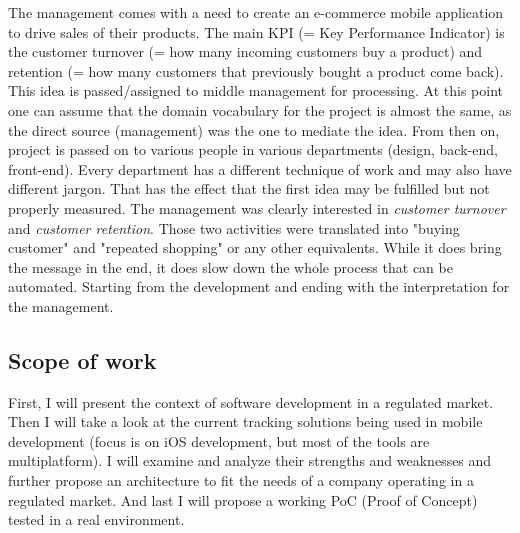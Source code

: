 The management comes with a need to create an e-commerce mobile application to drive sales of their products. The main KPI (= Key Performance Indicator) is the customer turnover (= how many incoming customers buy a product) and retention (= how many customers that previously bought a product come back). This idea is passed/assigned to middle management for processing. At this point one can assume that the domain vocabulary for the project is almost the same, as the direct source (management) was the one to mediate the idea. From then on, project is passed on to various people in various departments (design, back-end, front-end). Every department has a different technique of work and may also have different jargon. That has the effect that the first idea may be fulfilled but not properly measured. The management was clearly interested in \emph{customer turnover} and \emph{customer retention}. Those two activities were translated into "buying customer" and "repeated shopping" or any other equivalents. While it does bring the message in the end, it does slow down the whole process that can be automated. Starting from the development and ending with the interpretation for the management.

\subsection*{Scope of work}

First, I will present the context of software development in a regulated market. Then I will take a look at the current tracking solutions being used in mobile development (focus is on iOS development, but most of the tools are multiplatform). I will examine and analyze their strengths and weaknesses and further propose an architecture to fit the needs of a company operating in a regulated market. And last I will propose a working PoC (Proof of Concept) tested in a real environment.